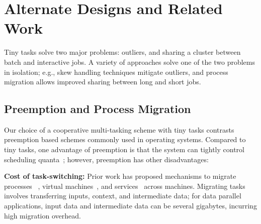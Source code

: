 \section{Alternate Designs and Related Work}
\label{sec:alternate}

Tiny tasks solve two major problems: outliers, and sharing
a cluster between batch and interactive jobs. A variety of
approaches solve one of the two problems in isolation; e.g., skew handling
techniques mitigate outliers, and process migration allows improved
sharing between long and short jobs.

\subsection{Preemption and Process Migration}
\label{sec:preemption}

Our choice of a cooperative multi-tasking scheme with tiny tasks 
contrasts preemption based schemes commonly used 
in operating systems.
Compared to tiny tasks, one advantage of preemption is that the system
can tightly control scheduling quanta~\cite{sherman1972trace,tanenbaum1990experiences};
however, preemption has other disadvantages:

\vspace{4pt}\noindent\textbf{Cost of task-switching:}
Prior work has proposed mechanisms to migrate processes
~\cite{douglis1991transparent,milojivcic2000process}, virtual machines~\cite{clark2005live}, and services~\cite{rozier1991overview} across machines.
Migrating tasks involves transferring inputs, context, and intermediate
data; for data parallel applications, input data and intermediate
data can be several gigabytes, incurring high migration overhead.


